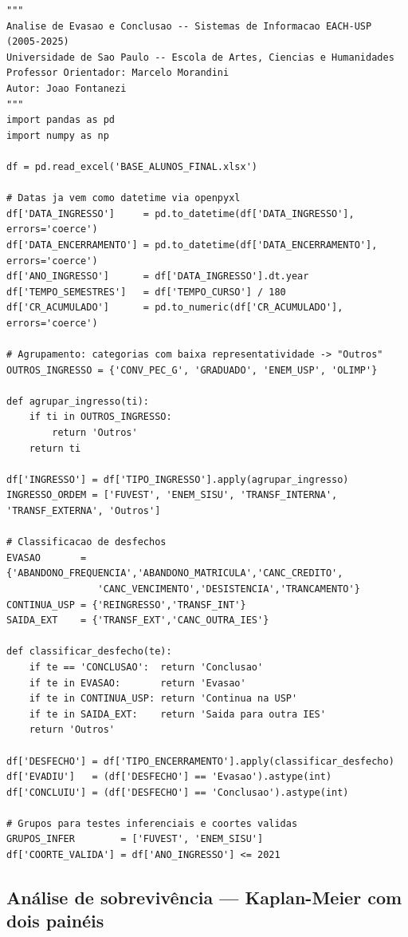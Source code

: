 \documentclass[12pt, a4paper]{article}
\begin{document}
\begin{lstlisting}[style=python, caption={Carga e agrupamento das formas de ingresso}]
"""
Analise de Evasao e Conclusao -- Sistemas de Informacao EACH-USP (2005-2025)
Universidade de Sao Paulo -- Escola de Artes, Ciencias e Humanidades
Professor Orientador: Marcelo Morandini
Autor: Joao Fontanezi
"""
import pandas as pd
import numpy as np

df = pd.read_excel('BASE_ALUNOS_FINAL.xlsx')

# Datas ja vem como datetime via openpyxl
df['DATA_INGRESSO']     = pd.to_datetime(df['DATA_INGRESSO'],     errors='coerce')
df['DATA_ENCERRAMENTO'] = pd.to_datetime(df['DATA_ENCERRAMENTO'], errors='coerce')
df['ANO_INGRESSO']      = df['DATA_INGRESSO'].dt.year
df['TEMPO_SEMESTRES']   = df['TEMPO_CURSO'] / 180
df['CR_ACUMULADO']      = pd.to_numeric(df['CR_ACUMULADO'], errors='coerce')

# Agrupamento: categorias com baixa representatividade -> "Outros"
OUTROS_INGRESSO = {'CONV_PEC_G', 'GRADUADO', 'ENEM_USP', 'OLIMP'}

def agrupar_ingresso(ti):
    if ti in OUTROS_INGRESSO:
        return 'Outros'
    return ti

df['INGRESSO'] = df['TIPO_INGRESSO'].apply(agrupar_ingresso)
INGRESSO_ORDEM = ['FUVEST', 'ENEM_SISU', 'TRANSF_INTERNA', 'TRANSF_EXTERNA', 'Outros']

# Classificacao de desfechos
EVASAO       = {'ABANDONO_FREQUENCIA','ABANDONO_MATRICULA','CANC_CREDITO',
                'CANC_VENCIMENTO','DESISTENCIA','TRANCAMENTO'}
CONTINUA_USP = {'REINGRESSO','TRANSF_INT'}
SAIDA_EXT    = {'TRANSF_EXT','CANC_OUTRA_IES'}

def classificar_desfecho(te):
    if te == 'CONCLUSAO':  return 'Conclusao'
    if te in EVASAO:       return 'Evasao'
    if te in CONTINUA_USP: return 'Continua na USP'
    if te in SAIDA_EXT:    return 'Saida para outra IES'
    return 'Outros'

df['DESFECHO'] = df['TIPO_ENCERRAMENTO'].apply(classificar_desfecho)
df['EVADIU']   = (df['DESFECHO'] == 'Evasao').astype(int)
df['CONCLUIU'] = (df['DESFECHO'] == 'Conclusao').astype(int)

# Grupos para testes inferenciais e coortes validas
GRUPOS_INFER        = ['FUVEST', 'ENEM_SISU']
df['COORTE_VALIDA'] = df['ANO_INGRESSO'] <= 2021
\end{lstlisting}

\subsection*{Análise de sobrevivência --- Kaplan-Meier com dois painéis}
\end{document}
